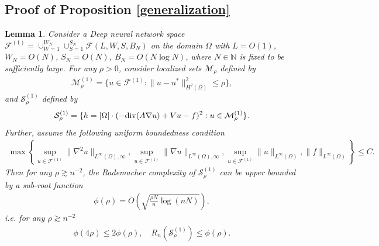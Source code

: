 \documentclass{article}
\newcommand{\F}{\mathcal{F}}
\renewcommand{\div}{\textnormal{div}}
\theoremstyle{plain}
\newtheorem{lemma}[theorem]{Lemma}
\theoremstyle{definition}
\theoremstyle{remark}
\begin{document}
\subsection{Proof of Proposition \ref{generalization}} \label{proof_generlization}

\begin{lemma} \label{bounding_local_rademacher1}
    Consider a Deep neural network space $\F^{(1)} = \cup_{W = 1}^{W_N} \cup_{S = 1}^{S_N} \F(L, W, S, B_N)$ on the domain $\Omega$ with $L = O(1)$, $W_N = O(N)$, $S_N = O(N)$, $B_N = O(N \log N)$, where $N \in \mathbb{N}$ is fixed to be sufficiently large. For any $\rho > 0$, consider localized sets  $\mathcal{M}_\rho$ defined by 
    \begin{align*}
        \mathcal{M}_\rho^{(1)} = \{u \in \F^{(1)}: \|u-u^* \|_{H^2(\Omega)}^2 \leq \rho\},
    \end{align*}
    and $\mathcal{S}_\rho^{(1)}$ defined by 
    \begin{align*}
        \mathcal{S}_\rho^{(1)} = \{h = |\Omega|\cdot(-\div(A \nabla u) + V u  -f )^2: u \in \mathcal{M}_\rho^{(1)}\}. 
    \end{align*}
    Further, assume the following uniform boundedness condition 
    \begin{align*}
        \max \left\{ \sup_{u \in \F^{(1)}} \|\nabla^2 u\|_{L^\infty(\Omega), \infty}, \sup_{u \in \F^{(1)}} \|\nabla u\|_{L^\infty(\Omega), \infty}, \sup_{u \in \F^{(1)}} \| u\|_{L^\infty(\Omega)}, \|f\|_{L^\infty(\Omega)}\right\} \leq C.
    \end{align*}
    Then for any $\rho \gtrsim n^{-2}$, the Rademacher complexity of $\mathcal{S}_\rho^{(1)}$
    can be upper bounded by a sub-root function
    \begin{align*}
        \phi(\rho) = O\left(\sqrt{\frac{\rho N}{n} \log(n N)}\right),
    \end{align*}
    i.e. for any $\rho \gtrsim n^{-2}$
    \begin{align*}
        \phi(4 \rho) \leq 2\phi(\rho), \quad R_{n} (\mathcal{S}_\rho^{(1)}) \leq \phi(\rho). 
    \end{align*}
    \end{lemma}
\end{document}
